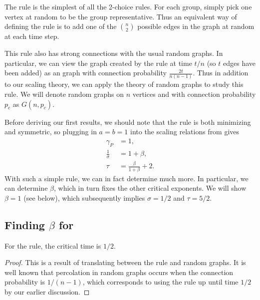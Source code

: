 \documentclass[twoside,10pt]{article}
\begin{document}
\section{\ER}

The \ER rule is the simplest of all the 2-choice rules. For each group, simply pick one vertex at random to be the group representative. Thus an equivalent way of defining the \ER rule is to add one of the $\binom{n}{2}$ possible edges in the graph at random at each time step.

This rule also has strong connections with the usual \ER random graphs. In particular, we can view the graph created by the \ER rule at time $t/n$ (so $t$ edges have been added) as an \ER graph with connection probability $\frac{2t}{n(n-1)}$. Thus in addition to our scaling theory, we can apply the theory of \ER random graphs to study this rule. We will denote \ER random graphs on $n$ vertices and with connection probability $p_c$ as $G(n,p_{c})$.

Before deriving our first results, we should note that the \ER rule is both minimizing and symmetric, so plugging in $a=b=1$ into the scaling relations from  gives
\begin{align*}
        \gamma_{P} &= 1,\\
        \frac{1}{\sigma} &= 1 + \beta,\\
        \tau &= \frac{\beta}{1+\beta} +2.
\end{align*}
With such a simple rule, we can in fact determine much more. In particular, we can determine $\beta$, which in turn fixes the other critical exponents. We will show $\beta=1$ (see  below), which subsequently implies $\sigma = 1/2$ and $\tau = 5/2$.

\subsection{Finding \texorpdfstring{$\beta$}{beta} for \ER}
\label{finding-beta}

\begin{lem}
	For the \ER rule, the critical time is $1/2$.
\end{lem}
\begin{proof}
	This is a result of translating between the \ER rule and \ER random graphs. It is well known \cite{princeton} that percolation in \ER random graphs occurs when the connection probability is $1/(n-1)$, which corresponds to using the \ER rule up until time $1/2$ by our earlier discussion.
\end{proof}
\end{document}
